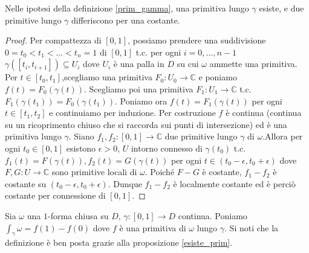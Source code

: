\begin{prop} \label{esiste_prim}
  Nelle ipotesi della definizione \ref{prim_gamma}, una primitiva lungo $\gamma$ esiste, e due primitive lungo $\gamma$ differiscono per una costante.
\end{prop}

\begin{proof}
  Per compattezza di $[0, 1]$, possiamo prendere una suddivisione $0=t_0<t_1<\dots<t_n=1$ di $[0, 1]$ t.c. per ogni $i=0,\dots, n-1$ $\gamma([t_i, t_{i+1}]) \subseteq U_i$ dove $U_i$ è una palla in $D$ su cui $\omega$ ammette una primitiva.
  Per $t \in [t_0, t_1]$,scegliamo una primitiva $F_0:U_0 \longrightarrow \mathbb{C}$ e poniamo $f(t)=F_0(\gamma(t))$. Scegliamo poi una primitiva $F_1:U_1 \longrightarrow \mathbb{C}$ t.c. $F_1(\gamma(t_1))=F_0(\gamma(t_1))$. Poniamo ora $f(t)=F_1(\gamma(t))$ per ogni $t \in [t_1, t_2]$ e continuiamo per induzione. Per costruzione $f$ è continua (continua su un ricoprimento chiuso che si raccorda sui punti di intersezione) ed è una primitiva lungo $\gamma$.
  Siano $f_1, f_2:[0, 1] \longrightarrow \mathbb{C}$ due primitive lungo $\gamma$ di $\omega$.Allora per ogni $t_0 \in [0, 1]$ esistono $\epsilon>0$, $U$ intorno connesso di $\gamma(t_0)$ t.c. $f_1(t)=F(\gamma(t)), f_2(t)=G(\gamma(t))$ per ogni $ t \in (t_0-\epsilon, t_0+\epsilon)$ dove $F, G:U \longrightarrow \mathbb{C}$ sono primitive locali di $\omega$.
  Poiché $F-G$ è costante, $f_1-f_2$ è costante su $(t_0-\epsilon, t_0+\epsilon)$. Dunque $f_1-f_2$ è localmente costante ed è perciò costante per connessione di $[0, 1]$.
\end{proof}

\begin{defn} \label{int_gamma_no2}
  Sia $\omega$ una $1$-forma chiusa su $D$, $\gamma:[0, 1] \longrightarrow D$ continua. Poniamo $\displaystyle \int_{\gamma} \omega=f(1)-f(0)$ dove $f$ è una primitiva di $\omega$ lungo $\gamma$. Si noti che la definizione è ben posta grazie alla proposizione \ref{esiste_prim}.
\end{defn}

